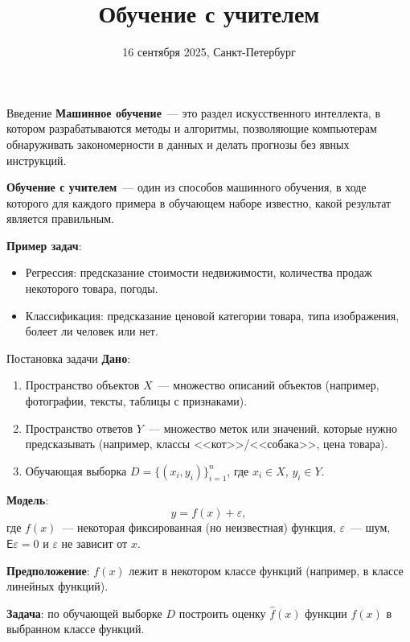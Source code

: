 \documentclass[notheorems, handout]{beamer}
\title[Статистическое и машинное обучение]{Обучение с учителем}
\institute[Санкт-Петербургский Государственный Университет]{%
	\small
	Санкт-Петербургский государственный университет\\
	Кафедра статистического моделирования
}
\date{16 сентября 2025, Санкт-Петербург}
\begin{document}
\begin{frame}
	\titlepage
\end{frame}

\begin{frame}{Введение}
	\textbf{Машинное обучение}~--- это раздел искусственного интеллекта, в котором разрабатываются методы и алгоритмы, позволяющие компьютерам обнаруживать закономерности в данных и делать прогнозы без явных инструкций.\medskip

	\textbf{Обучение с учителем}~--- один из способов машинного обучения, в ходе которого для каждого примера в обучающем наборе известно, какой результат является правильным.\medskip

	\textbf{Пример задач}:
	\begin{itemize}
		\item Регрессия: предсказание стоимости недвижимости, количества продаж некоторого товара, погоды.
		\item Классификация: предсказание ценовой категории товара, типа изображения, болеет ли человек или нет.
	\end{itemize}
\end{frame}

\begin{frame}{Постановка задачи}
	\textbf{Дано}:
	\begin{enumerate}
		\item Пространство объектов $X$~--- множество описаний объектов (например, фотографии, тексты, таблицы с признаками).
		\item Пространство ответов $Y$~--- множество меток или значений, которые нужно предсказывать (например, классы <<кот>>/<<собака>>, цена товара).
		\item Обучающая выборка $D = \{(x_i, y_i)\}_{i=1}^n$, где $x_i\in X$, $y_i\in Y$.
	\end{enumerate}
	\textbf{Модель}:
	\[
		y=f(x) + \varepsilon,
	\]
	где $f(x)$~--- некоторая фиксированная (но неизвестная) функция, $\varepsilon$~--- шум, $\mathsf{E}\varepsilon=0$ и $\varepsilon$ не зависит от $x$.\medskip

	\textbf{Предположение}: $f(x)$ лежит в некотором классе функций (например, в классе линейных функций).\medskip

	\textbf{Задача}: по обучающей выборке $D$ построить оценку $\hat f(x)$ функции $f(x)$ в выбранном классе функций.
\end{frame}
\end{document}
